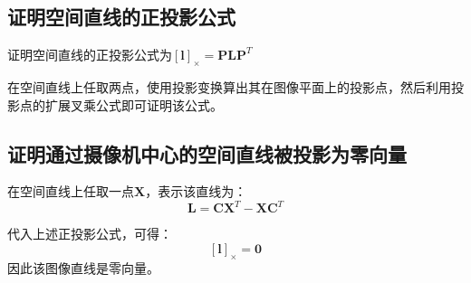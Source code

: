 \documentclass[11pt]{article}
\begin{document}
\subsection{证明空间直线的正投影公式}
{\heiti 证明空间直线的正投影公式为$\mathbf{[l]}_\times=\mathbf{P}\mathbf{LP}^T$}\par
在空间直线上任取两点，使用投影变换算出其在图像平面上的投影点，然后利用投影点的扩展叉乘公式即可证明该公式。
\subsection{证明通过摄像机中心的空间直线被投影为零向量}
在空间直线上任取一点$\mathbf{X}$，表示该直线为：
\begin{equation*}
  \mathbf{L}=\mathbf{CX}^{T}-\mathbf{XC}^T
\end{equation*}\par
代入上述正投影公式，可得：
\begin{equation*}
  \mathbf{[l]}_\times=\mathbf{0}
\end{equation*}
因此该图像直线是零向量。
\end{document}
